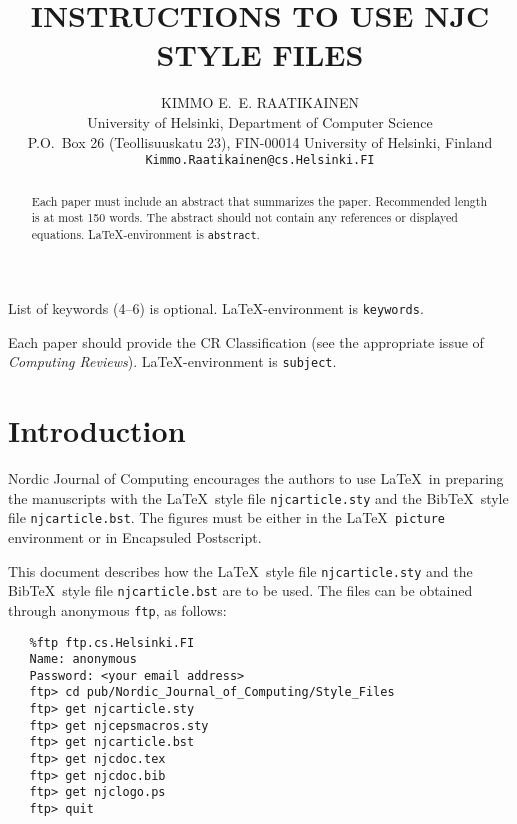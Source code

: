 
\titlehead{Instruction to us njc style files}

\title{INSTRUCTIONS TO USE NJC STYLE FILES}

\author{KIMMO E.~E. RAATIKAINEN\\
University of Helsinki, Department of Computer Science\\
P.O.~Box 26 (Teollisuuskatu 23), FIN-00014 University of Helsinki, Finland\\
{\tt Kimmo.Raatikainen@cs.Helsinki.FI}}

\usenjcepsmacros
\njccitationstyle
{}
\draft


\maketitle

\begin{abstract}
Each paper must include an abstract that summarizes the paper.
Recommended length is at most 150 words.
The abstract should not contain any references or displayed equations.
\LaTeX-environment is \verb|abstract|.
\end{abstract}

\begin{keywords}
List of keywords (4--6) is optional. \LaTeX-environment is \verb|keywords|.
\end{keywords}

\begin{subject}
Each paper should provide the CR Classification
(see the appropriate issue of {\it Computing Reviews\/}).
\LaTeX-environment is \verb|subject|.
\end{subject}

\section{Introduction}

{\sc Nordic Journal of Computing} encourages 
the authors to use \LaTeX\ in preparing the manuscripts with the
\LaTeX\  style file \verb|njcarticle.sty| and the
Bib\TeX\ style file \verb|njcarticle.bst|.
The figures must be either in the \LaTeX\ {\tt picture} environment
or in Encapsuled Postscript.

This document describes how the \LaTeX\ style file {\tt njcarticle.sty}
and the Bib\TeX\ style file {\tt njcarticle.bst} are to be used.
The files can be obtained through anonymous {\tt ftp}, as follows:
\begin{verbatim}
   %ftp ftp.cs.Helsinki.FI
   Name: anonymous
   Password: <your email address>
   ftp> cd pub/Nordic_Journal_of_Computing/Style_Files
   ftp> get njcarticle.sty
   ftp> get njcepsmacros.sty
   ftp> get njcarticle.bst
   ftp> get njcdoc.tex
   ftp> get njcdoc.bib
   ftp> get njclogo.ps
   ftp> quit
\end{verbatim}

